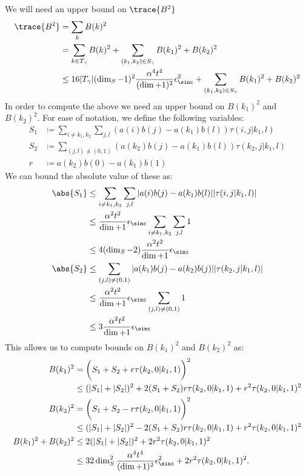    We will need an upper bound on $\trace{B^2}$
    \begin{align}
        \trace{B^2} &= \sum_k B(k)^2 \\
        &= \sum_{k \in T_{\gamma}} B(k)^2 + \sum_{(k_1, k_2) \in S_{\gamma}} B(k_1)^2 + B(k_2)^2 \\
        &\leq 16 |T_{\gamma}| (\dim_S - 1)^2 \frac{\alpha^4 t^4}{(\dim + 1)^2}\epsilon_{\sinc}^2 + \sum_{(k_1, k_2) \in S_{\gamma}} B(k_1)^2 + B(k_2)^2
    \end{align}
    In order to compute the above we need an upper bound on $B(k_1)^2$ and $B(k_2)^2$. For ease of notation, we define the following variables:
    \begin{align}
        S_1 &\coloneqq \sum_{i \neq k_1, k_2} \sum_{j,l} (a(i) b(j) - a(k_1) b(l)) \tau(i, j|k_1, l) \\
        S_2 &\coloneqq \sum_{(j,l) \neq (0, 1)} (a(k_2) b(j) - a(k_1) b(l)) \tau(k_2, j| k_1, l) \\
        r &\coloneqq a(k_2) b(0) - a(k_1) b(1) 
    \end{align}
    We can bound the absolute value of these as:
    \begin{align}
        \abs{S_1} &\leq \sum_{i \neq k_1, k_2} \sum_{j,l} |a(i) b(j) - a(k_1) b(l)| |\tau(i, j|k_1, l)| \\
        &\leq \frac{\alpha^2 t^2}{\dim + 1} \epsilon_{\sinc} \sum_{i \neq k_1, k_2} \sum_{j,l} 1\\
        &\leq 4 (\dim_S - 2) \frac{\alpha^2 t^2}{\dim + 1} \epsilon_{\sinc} \\
        \abs{S_2} &\leq \sum_{(j,l) \neq (0,1)} |a(k_1) b(j) - a(k_2) b(j)| |\tau(k_2, j | k_1, l)| \\
        &\leq \frac{\alpha^2 t^2}{\dim + 1} \epsilon_{\sinc} \sum_{(j,l) \neq (0,1)} 1 \\
        &\leq 3 \frac{\alpha^2 t^2}{\dim + 1} \epsilon_{\sinc}
    \end{align}
    This allows us to compute bounds on $B(k_1)^2$ and $B(k_2)^2$ as:
    \begin{align}
        B(k_1)^2 &= \bigg( S_1 + S_2 + r \tau(k_2, 0| k_1, 1) \bigg)^2 \\
        &\leq (|S_1| + |S_2|)^2 + 2(S_1 + S_2) r \tau(k_2, 0| k_1, 1) + r^2 \tau(k_2, 0| k_1, 1)^2 \\
        B(k_2)^2 &= \bigg( S_1 + S_2 - r \tau(k_2, 0 | k_1, 1) \bigg)^2 \\
        &\leq (|S_1| + |S_2|)^2 - 2 (S_1 + S_2) r \tau(k_2, 0 | k_1, 1) + r^2 \tau(k_2, 0 | k_1, 1)^2 \\
        B(k_1)^2 + B(k_2)^2 &\leq 2 (|S_1| + |S_2|)^2 + 2 r^2 \tau(k_2, 0 | k_1, 1)^2 \\
        &\leq 32 \dim_S^2 \frac{\alpha^4 t^4}{(\dim + 1)^2} \epsilon_{\sinc}^2 + 2 r^2 \tau(k_2, 0 | k_1, 1)^2.
    \end{align}
